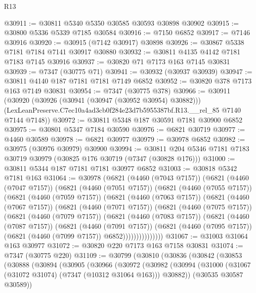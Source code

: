 \begin{lexlean}{R13}
\begin{coremodule}
@30911 := @30811 @5340 @5350 @30585 @30593 @30898 @30902
@30915 := @30800 @5336 @5339 @7185 @30584
@30916 := @7150 @6852
@30917 := @7146 @30916
@30920 := @30915 (@7142 @30917) @30898
@30926 := @30867 @5338 @7181 @7184 @7141 @30917 @30880
@30932 := @30811 @4135 @4142 @7181 @7183 @7145 @30916
@30937 := @30820 @71 @7173 @163 @7145 @30831
@30939 := @7347 (@30775 @71)
@30941 := @30932 (@30937 @30939)
@30947 := @30811 @4140 @187 @7181 @7181 @7149 @6852
@30952 := @30820 @378 @7173 @163 @7149 @30831
@30954 := @7347 (@30775 @378)
@30966 := @30911
    (@30920
      (@30926 (@30941 (@30947 (@30952 @30954) @30882)))
      (LexLeanPreserve.C7ec10a4ad3cb0f284e23d7b5955387bf.R13.__rel_85 @7140 @7144 @7148))
@30972 := @30811 @5348 @187 @30591 @7181 @30900 @6852
@30975 := @30801 @5347 @7184 @30590
@30976 := @6821 @30719
@30977 := @4460 @30589
@30978 := @6821 @30977
@30979 := @30978 @6852
@30982 := @30975 (@30976 @30979) @30900
@30994 := @30811 @204 @5346 @7181 @7183 @30719 @30979 (@30825 @176 @30719 (@7347 (@30828 @176)))
@31000 := @30811 @5344 @187 @7181 @7181 @30977 @6852
@31003 := @30818 @5342 @7181 @163
@31064 := @30978
    (@6821
      (@4460 (@7043 @7157))
      (@6821
        (@4460 (@7047 @7157))
        (@6821
          (@4460 (@7051 @7157))
          (@6821
            (@4460 (@7055 @7157))
            (@6821
              (@4460 (@7059 @7157))
              (@6821
                (@4460 (@7063 @7157))
                (@6821
                  (@4460 (@7067 @7157))
                  (@6821
                    (@4460 (@7071 @7157))
                    (@6821
                      (@4460 (@7075 @7157))
                      (@6821
                        (@4460 (@7079 @7157))
                        (@6821
                          (@4460 (@7083 @7157))
                          (@6821
                            (@4460 (@7087 @7157))
                            (@6821
                              (@4460 (@7091 @7157))
                              (@6821
                                (@4460 (@7095 @7157))
                                (@6821 (@4460 (@7099 @7157)) @6852)))))))))))))))
@31067 := @31003 @31064 @163 @30977
@31072 := @30820 @220 @7173 @163 @7158 @30831
@31074 := @7347 (@30775 @220)
@31109 := @30799
    (@30810
      (@30836
        (@30842
          (@30853
            (@30888
              (@30894
                (@30905
                  (@30966
                    (@30972
                      (@30982
                        (@30994
                          (@31000 (@31067 (@31072 @31074) (@7347 (@10312 @31064 @163))) @30882))
                        (@30535 @30587 @30589))

\end{coremodule}
\end{lexlean}
